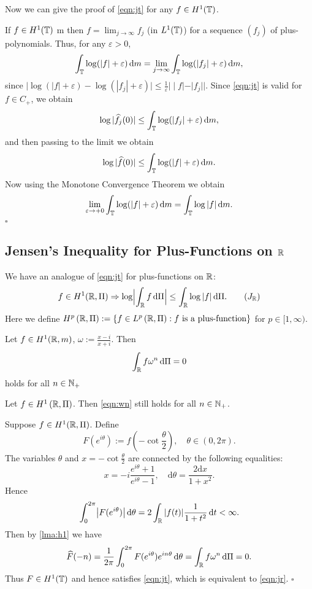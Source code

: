 Now we can give the proof of \cref{eqn:jt} for any $f\in H^{1}(\mathbb{T})$.

 If $f \in H^{1}(\mathbb{T})$ m then $f=\lim_{j \to \infty} f_j$ (in $L^{1}(\mathbb{T})$) for a sequence $(f_j)$ of plus-polynomials. Thus, for any $\varepsilon >0$,
\[
\int_{\mathbb{T}}\log(|f|+\varepsilon )\,\mathrm{d} m =\lim_{j \to \infty} \int_{\mathbb{T}}\log(|f_j|+\varepsilon )\,\mathrm{d} m,
\] 
since $\bigl|\log(|f|+\varepsilon )-\log(|f_j|+\varepsilon )\bigr|\le \frac{1}{\varepsilon }\bigl| \mid f|-|f_j|\bigr|$. Since \cref{eqn:jt} is valid for $f\in C_{+}$, we obtain
\[
\log |\widehat{f_j}(0)|\le \int_{\mathbb{T}}\log (|f_j|+\varepsilon )\,\mathrm{d} m,
\] 
and then passing to the limit we obtain
\[
\log |\widehat{f}(0)|\le \int_{\mathbb{T}}\log(|f|+\varepsilon )\,\mathrm{d} m.
\] 
Now using the Monotone Convergence Theorem we obtain
\[
\lim_{\varepsilon  \to +0} \int_{\mathbb{T}}\log(|f|+\varepsilon )\,\mathrm{d} m=\int_{\mathbb{T}}\log|f|\,\mathrm{d} m.
\]\hfill $\square$ 

\subsection{Jensen's Inequality for Plus-Functions on $\mathbb{R}$} We have an analogue of \cref{eqn:jt} for plus-functions on $\mathbb{R}$:
\begin{equation}\label{eqn:jr}
	f\in H^{1}(\R,\Pi)\Rightarrow \log \Bigl|\int_{\R}f\d \Pi\Bigr|\le \int_{\R} \log|f|\d \Pi.\tag{$J_{\R}$}
\end{equation}
Here we define $H^{p}\left( \mathbb{R},\Pi \right) :=\left\{f \in L^{p}\left( \mathbb{R},\Pi \right) : f \text{ is a plus-function} \right\} $ for $p \in [1,\infty)$.


 
\begin{lemma}
	Let $f \in H^{1}(\mathbb{R},m)$, $\displaystyle \omega:=\frac{x-i}{x+i}$. Then 
	\begin{equation}\label{eqn:wn}
		\int_{\mathbb{R}} f \omega^{n}\,\mathrm{d} \Pi=0
	\end{equation}
	holds for all $n\in \mathbb{N}_{+}$
\end{lemma}

\begin{lemma}\label{lma:h1}
	Let $f \in H^{1}\left( \mathbb{R},\Pi \right) $. Then \cref{eqn:wn} still holds for all $n\in \mathbb{N}_{+}$. 
\end{lemma}



 Suppose $f\in H^{1}(\mathbb{R},\Pi)$. Define
\[
F(e^{i\theta }):=f\left( -\cot \frac{\theta }{2} \right), \quad \theta \in (0,2\pi).
\] 
The variables $\theta $ and $x=-\cot \frac{\theta }{2}$ are connected by the following equalities:
\[
x=-i \frac{e^{i\theta }+1}{e^{i\theta }-1}, \quad \mathrm{d}\theta =\frac{2\mathrm{d}x}{1+x^2}.
\] 
Hence 
\[
\int_0^{2\pi}\bigl|F(e^{i\theta })\bigr|\,\mathrm{d} \theta =2 \int_{\mathbb{R}}|f(t)| \frac{1}{1+t^2}\,\mathrm{d} t<\infty.
\] 
Then by \cref{lma:h1} we have
\[
\widehat{F}(-n)=\frac{1}{2\pi}\int_0^{2\pi}F(e^{i\theta })e^{i n \theta  }\,\mathrm{d} \theta  = \int_{\mathbb{R}}f\omega^{n}\,\mathrm{d} \Pi =0.
\]
Thus $F\in H^{1}(\mathbb{T})$ and hence satisfies \cref{eqn:jt}, which is equivalent to \cref{eqn:jr}.
\hfill $\square$

